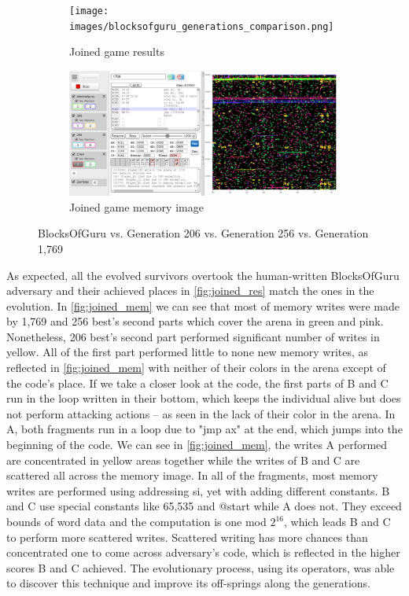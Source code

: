 \documentclass[dvipsnames,format=sigconf,anonymous=true,review=true]{acmart}
\begin{document}
\begin{figure}
  \centering
  \begin{subfigure}{0.48\textwidth}
    \texttt{[image: images/blocksofguru\_generations\_comparison.png]}
    \caption{Joined game results}
    \label{fig:joined_res}
  \end{subfigure}
  \hfill
  \begin{subfigure}{0.48\textwidth}
    \includegraphics[width=\linewidth]{images/blocksofguru_generations_comparison_memory.png}
    \caption{Joined game memory image}
    \label{fig:joined_mem}
  \end{subfigure}
  \caption{BlocksOfGuru vs. Generation 206 vs. Generation 256 vs. Generation 1,769}
  \label{fig:joinedgame}
\end{figure}

As expected, all the evolved survivors overtook the human-written BlocksOfGuru adversary and their achieved places in \autoref{fig:joined_res} match the ones in the evolution. In \autoref{fig:joined_mem} we can see that most of memory writes were made by 1,769 and 256 best's second parts which cover the arena in green and pink. Nonetheless, 206 best's second part performed significant number of writes in yellow. All of the first part performed little to none new memory writes, as reflected in \autoref{fig:joined_mem} with neither of their colors in the arena except of the code's place.
If we take a closer look at the code, the first parts of B and C run in the loop written in their bottom, which keeps the individual alive but does not perform attacking actions -- as seen in the lack of their color in the arena. In A, both fragments run in a loop due to "jmp ax" at the end, which jumps into the beginning of the code. 
 We can see in \autoref{fig:joined_mem}, the writes A performed are concentrated in yellow areas together while the writes of B and C are scattered all across the memory image. In all of the fragments, most memory writes are performed using addressing si, yet with adding different constants. B and C use special constants like 65,535 and @start while A does not. They exceed bounds of word data and the computation is one mod $2^{16}$, which leads B and C to perform more scattered writes. Scattered writing has more chances than concentrated one to come across adversary's code, which is reflected in the higher scores B and C achieved. The evolutionary process, using its operators, was able to discover this technique and improve its off-springs along the generations.
\end{document}
